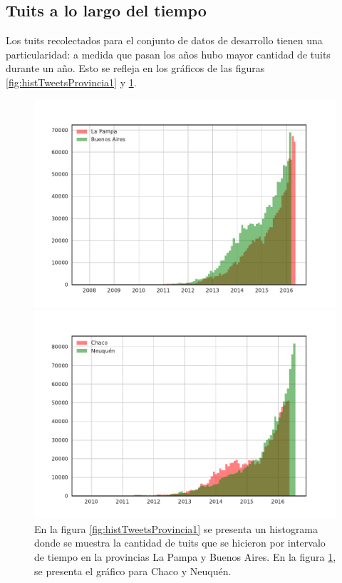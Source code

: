 \subsection{Tuits a lo largo del tiempo}
Los tuits recolectados para el conjunto de datos de desarrollo tienen una particularidad: a medida que pasan los años 
hubo mayor cantidad de tuits durante un año. Esto se refleja en los gráficos de las figuras \ref{fig:histTweetsProvincia1} y \ref{fig:histTweetsProvincia2}.

\begin{figure}[!ht]\centering
   \begin{minipage}{0.49\textwidth}
     \includegraphics[width=\linewidth]{./images/train/sinFiltro/histTweetsProvincia1_sinFiltro.pdf}
     \caption{}
     \label{fig:histTweetsProvincia1}
   \end{minipage}
   \begin {minipage}{0.49\textwidth}
     \includegraphics[width=\linewidth]{./images/train/sinFiltro/histTweetsProvincia2_sinFiltro.pdf}
     \caption{}
     \label{fig:histTweetsProvincia2}
   \end{minipage}
   \caption { En la figura \ref{fig:histTweetsProvincia1} se presenta un histograma donde se muestra la cantidad de tuits que se hicieron por intervalo de tiempo en la provincias La Pampa y Buenos Aires. En la figura \ref{fig:histTweetsProvincia2}, se presenta el gráfico para Chaco y Neuquén.}
\end{figure}


